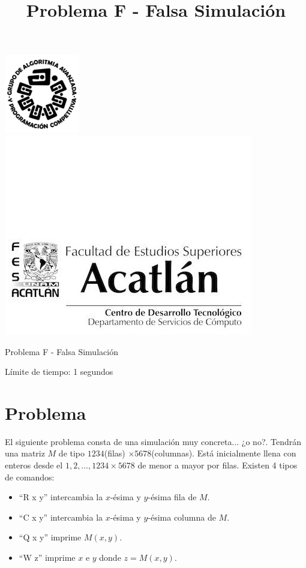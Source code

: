 \documentclass[letter,10pt]{article}
\date{}
\begin{document}
\title{Problema F -  Falsa Simulación}

\includegraphics[scale=0.6]{logo} \hspace*{9.00cm}
\includegraphics[scale=0.5]{dsc} 
\bigskip
\begin{center}
	\Large Problema F -  Falsa Simulación
\end{center}

\begin{flushright}
Límite de tiempo: 1 segundos
\par\end{flushright}
\bigskip

\section*{Problema}

El siguiente problema consta de una simulación muy concreta... ¿o no?.
Tendrán una matriz $M$ de tipo $1234$(filas) $\times 5678$(columnas). Está inicialmente llena con enteros
desde el $1, 2, \dots, 1234 \times 5678$ de menor a mayor por filas.
Existen 4 tipos de comandos:
\begin{itemize}
    \item ``R x y'' intercambia la $x$-ésima y $y$-ésima fila de $M$.
    \item ``C x y'' intercambia la $x$-ésima y $y$-ésima columna de $M$.
    \item ``Q x y'' imprime  $M(x,y)$.
    \item ``W z'' imprime $x$ e $y$ donde $z=M(x,y)$.
\end{itemize}
\end{document}
